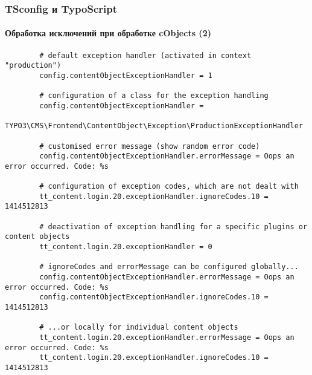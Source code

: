 \begin{frame}[fragile]
	\frametitle{TSconfig и TypoScript}
	\framesubtitle{Обработка исключений при обработке cObjects (2)}
	
	\lstset{
		basicstyle=\tiny\ttfamily
	}
	
	\begin{lstlisting}
		# default exception handler (activated in context "production")
		config.contentObjectExceptionHandler = 1

		# configuration of a class for the exception handling
		config.contentObjectExceptionHandler =
		  TYPO3\CMS\Frontend\ContentObject\Exception\ProductionExceptionHandler

		# customised error message (show random error code)
		config.contentObjectExceptionHandler.errorMessage = Oops an error occurred. Code: %s

		# configuration of exception codes, which are not dealt with
		tt_content.login.20.exceptionHandler.ignoreCodes.10 = 1414512813

		# deactivation of exception handling for a specific plugins or content objects
		tt_content.login.20.exceptionHandler = 0

		# ignoreCodes and errorMessage can be configured globally...
		config.contentObjectExceptionHandler.errorMessage = Oops an error occurred. Code: %s
		config.contentObjectExceptionHandler.ignoreCodes.10 = 1414512813

		# ...or locally for individual content objects
		tt_content.login.20.exceptionHandler.errorMessage = Oops an error occurred. Code: %s
		tt_content.login.20.exceptionHandler.ignoreCodes.10 = 1414512813
	\end{lstlisting}

\end{frame}


